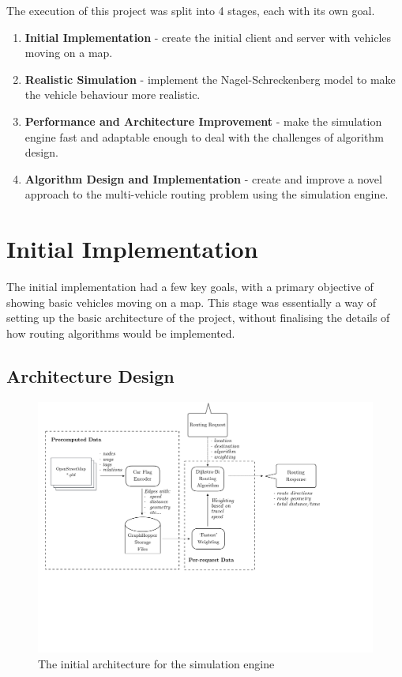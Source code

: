\documentclass[ %
                    author={Alexander Hill},
                supervisor={Dr. Benjamin Sach},
                    degree={MEng},
                     title={MARMOSET},
                  subtitle={Multi-Agent Route Management using Online Simulation for Efficient Transportation},
                      type={research},
                      year={2016} ]{dissertation}
\begin{document}
The execution of this project was split into 4 stages, each with its own goal.

\begin{enumerate}
    \item \textbf{Initial Implementation} - create the initial client and
        server with vehicles moving on a map.
    \item \textbf{Realistic Simulation} - implement the Nagel-Schreckenberg
        model to make the vehicle behaviour more realistic.
    \item \textbf{Performance and Architecture Improvement} - make the
        simulation engine fast and adaptable enough to deal with the challenges
        of algorithm design.
    \item \textbf{Algorithm Design and Implementation} - create and improve
        a novel approach to the multi-vehicle routing problem using the
        simulation engine.
\end{enumerate}

\section{Initial Implementation}

The initial implementation had a few key goals, with a primary objective of
showing basic vehicles moving on a map. This stage was essentially a way of
setting up the basic architecture of the project, without finalising the
details of how routing algorithms would be implemented.

\subsection{Architecture Design}

\begin{figure}[h]
    \centering
    \includegraphics[scale=0.5,page=2,clip,trim=0 17cm 3cm 0]{architecture}
    \caption{The initial architecture for the simulation engine}\label{fig:init-arch}
\end{figure}
\end{document}
